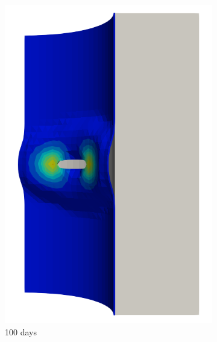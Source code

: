\begin{figure}[!htb]
\begin{subfigure}[b]{0.2\textwidth}
    \includegraphics[width=\textwidth]{Chapter5/figures/spallation/seed_ep_3}
    \caption{100 days}
  \end{subfigure}
  \begin{subfigure}[b]{0.2\textwidth}
    \centering

\end{subfigure}
\end{figure}
